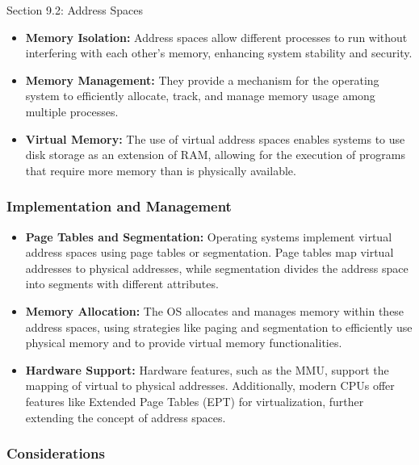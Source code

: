 \begin{notes}{Section 9.2: Address Spaces}
    \begin{itemize}
        \item \textbf{Memory Isolation:} Address spaces allow different processes to run without interfering with each other's memory, enhancing system stability and security.
        \item \textbf{Memory Management:} They provide a mechanism for the operating system to efficiently allocate, track, and manage memory usage among multiple processes.
        \item \textbf{Virtual Memory:} The use of virtual address spaces enables systems to use disk storage as an extension of RAM, allowing for the execution of programs that require more memory 
        than is physically available.
    \end{itemize}
    
    \subsubsection*{Implementation and Management}
    
    \begin{itemize}
        \item \textbf{Page Tables and Segmentation:} Operating systems implement virtual address spaces using page tables or segmentation. Page tables map virtual addresses to physical addresses, while 
        segmentation divides the address space into segments with different attributes.
        \item \textbf{Memory Allocation:} The OS allocates and manages memory within these address spaces, using strategies like paging and segmentation to efficiently use physical memory and to 
        provide virtual memory functionalities.
        \item \textbf{Hardware Support:} Hardware features, such as the MMU, support the mapping of virtual to physical addresses. Additionally, modern CPUs offer features like Extended Page Tables 
        (EPT) for virtualization, further extending the concept of address spaces.
    \end{itemize}
    
    \subsubsection*{Considerations}
    

\end{notes}
